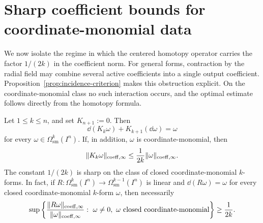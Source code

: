 \section{Sharp coefficient bounds for coordinate-monomial data}

We now isolate the regime in which the centered homotopy operator carries the
factor $1/(2k)$ in the coefficient norm. For general forms, contraction by the
radial field may combine several active coefficients into a single output
coefficient. Proposition~\ref{prop:incidence-criterion} makes this obstruction
explicit. On the coordinate-monomial class no such interaction occurs, and the
optimal estimate follows directly from the homotopy formula.

\begin{theorem}
\label{thm:optimal-continuous-inverse}
Let $1\le k\le n$, and set $K_{n+1}:=0$. Then
\begin{equation}
\label{eq:homotopy-identity}
\dd(K_k\omega)+K_{k+1}(\dd\omega)=\omega
\end{equation}
for every $\omega\in\Omega^k_{\mathrm{sm}}(I^n)$. If, in addition, $\omega$ is
coordinate-monomial, then
\begin{equation}
\label{eq:continuous-supnorm-bound}
\lVert K_k\omega \rVert_{\mathrm{coeff},\infty}\le \frac{1}{2k}\lVert \omega \rVert_{\mathrm{coeff},\infty}.
\end{equation}
The constant $1/(2k)$ is sharp on the class of closed coordinate-monomial
$k$-forms. In fact, if
$R:\Omega^k_{\mathrm{sm}}(I^n)\to\Omega^{k-1}_{\mathrm{sm}}(I^n)$ is linear and
$\dd(R\omega)=\omega$ for every closed coordinate-monomial $k$-form $\omega$,
then necessarily
\[
\sup\left\{
\frac{\norm{R\omega}_{\coeff,\infty}}{\norm{\omega}_{\coeff,\infty}}:\ 
\omega\neq 0,\ \omega \text{ closed coordinate-monomial}
\right\}
\ge \frac{1}{2k}.
\]
\end{theorem}

